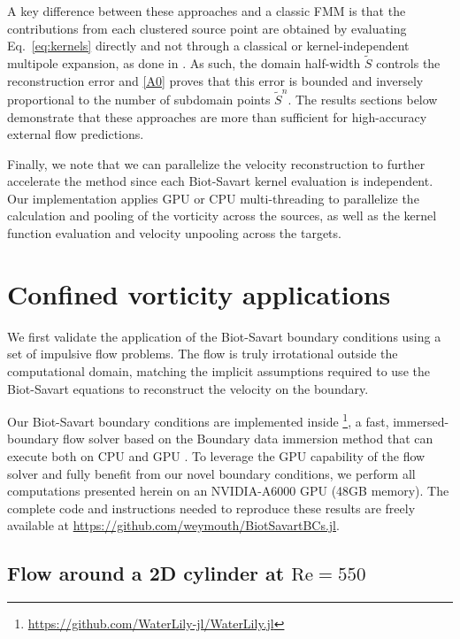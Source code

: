 \documentclass[final,1p,times]{elsarticle}
\begin{document}
A key difference between these approaches and a classic FMM is that the contributions from each clustered source point are obtained by evaluating Eq.~\ref{eq:kernels} directly and not through a classical or kernel-independent multipole expansion, as done in \cite{Ying2004ADimensions, Liska2014AEquations}. As such, the domain half-width $\tilde S$ controls the reconstruction error and \ref{A0} proves that this error is bounded and inversely proportional to the number of subdomain points $\tilde S^n$. The results sections below demonstrate that these approaches are more than sufficient for high-accuracy external flow predictions.

Finally, we note that we can parallelize the velocity reconstruction to further accelerate the method since each Biot-Savart kernel evaluation is independent. Our implementation applies GPU or CPU multi-threading to parallelize the calculation and pooling of the vorticity across the sources, as well as the kernel function evaluation and velocity unpooling across the targets.


\section{Confined vorticity applications}

We first validate the application of the Biot-Savart boundary conditions using a set of impulsive flow problems. The flow is truly irrotational outside the computational domain, matching the implicit assumptions required to use the Biot-Savart equations to reconstruct the velocity on the boundary. 

Our Biot-Savart boundary conditions are implemented inside \textbf{}\footnote{\url{https://github.com/WaterLily-jl/WaterLily.jl}}, a fast, immersed-boundary flow solver based on the Boundary data immersion method \cite{Maertens2015} that can execute both on CPU and GPU \cite{Weymouth2023WaterLily.jl:Execution}. To leverage the GPU capability of the flow solver and fully benefit from our novel boundary conditions, we perform all computations presented herein on an NVIDIA-A6000 GPU (48GB memory). The complete code and instructions needed to reproduce these results are freely available at \url{https://github.com/weymouth/BiotSavartBCs.jl}.


\subsection{Flow around a 2D cylinder at $\text{Re}=550$}
\end{document}
